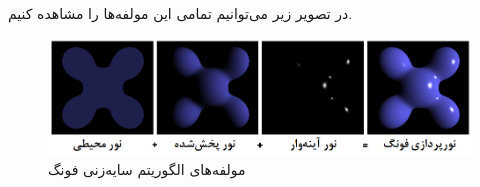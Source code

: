 در تصویر زیر می‌توانیم تمامی این مولفه‌ها را مشاهده کنیم.

\begin{figure}[ht]
	\centerline{\includegraphics[width=\textwidth,height=\textheight,keepaspectratio]{Figures/Ch2/Phong_components.png}}

	\caption{مولفه‌های الگوریتم سایه‌زنی فونگ
    \cite{PhongShadingWikipedia}
    }
	\label{fig:PhongShadingWikipedia}
\end{figure}
